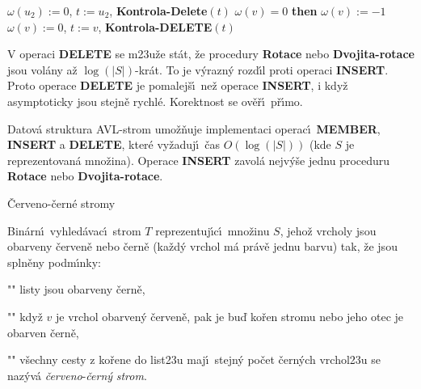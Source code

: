 \phantom{---------}$\omega \left(u_2\right):=0$, $t:=u_2$, {\bf Kontrola-Delete}$\left(t\right)$\newline
\phantom{------}{\bf endif}\newline 
\phantom{---}{\bf else}\newline 
\phantom{------}{\bf if} $\omega \left(v\right)=0$ {\bf then}\newline 
\phantom{---------}$\omega \left(v\right):=-1$\newline 
\phantom{------}{\bf else}\newline 
\phantom{---------}$\omega \left(v\right):=0$, $t:=v$, {\bf Kontrola-DELETE}$\left(t\right)$\newline 
\phantom{------}{\bf endif}\newline 
\phantom{---}{\bf endif\newline 
endif}
\medskip

\flushpar V operaci {\bf DELETE} se m\accent23u\v ze st\'at, \v ze procedury 
{\bf Rotace} nebo {\bf Dvojita-rotace} jsou vol\'any a\v z $\log\left(
|S|\right)$-kr\'at. 
To je v\'yrazn\'y rozd\'\i l proti operaci {\bf INSERT}. Proto operace 
{\bf DELETE} je pomalej\v s\'\i\ ne\v z operace {\bf INSERT}, i kdy\v z 
asymptoticky jsou stejn\v e rychl\'e. Korektnost se 
ov\v e\v r\'\i\ p\v r\'\i mo.

Datov\'a struktura AVL-strom 
umo\v z\v nuje implementaci operac\'\i\ {\bf MEMBER}, {\bf INSERT} a 
{\bf DELETE}, kter\'e vy\v zaduj\'\i\ \v cas $O\left(\log\left(|S|\right)\right)$ (kde $
S$ je 
reprezentovan\'a mno\v zina).  Ope\-race {\bf INSERT} zavol\'a 
nejv\'y\v se jednu proceduru {\bf Rotace} nebo {\bf Dvo\-ji\-ta-rotace}.  
\endproclaim
\medskip

\heading 
\v Cerveno-\v cern\'e stromy
\endheading

\flushpar Bin\'arn\'\i\ vyhled\'avac\'\i\ strom $T$ reprezentuj\'\i c\'\i\ 
mno\v zinu $S$, jeho\v z vrcholy jsou obarveny \v cerven\v e nebo 
\v cern\v e (ka\v zd\'y vrchol m\'a pr\'av\v e jednu barvu) tak, \v ze jsou 
spln\v eny podm\'\i nky:
\roster
\item"{}"
listy jsou obarveny \v cern\v e,
\item"{}"
kdy\v z $v$ je vrchol obarven\'y \v cerven\v e, pak je bu\v d ko\v ren 
stromu nebo jeho otec je obarven \v cern\v e,
\item"{}"
v\v sechny cesty z ko\v rene do list\accent23u maj\'\i\ stejn\'y 
po\v cet \v cer\-n\'ych vrchol\accent23u
\endroster
se naz\'yv\'a \emph{\v cerveno}-\emph{\v cern\'y} \emph{strom}. 
\medskip


